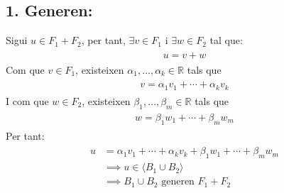 \documentclass[a4paper, 11pt]{article}
\begin{document}
            \subsection*{1. Generen:}
                Sigui ${u \in F_1 + F_2}$, per tant, ${\exists v \in F_1 \text{ i } \exists w\in F_2}$ tal que:
                \begin{align*}
                    \begin{aligned}
                        u = v + w
                    \end{aligned}
                \end{align*}
                Com que ${v \in F_1}$, existeixen ${\alpha_1,\dots,\alpha_k \in \mathbb{R}}$ tals que 
                \begin{align*}
                    \begin{aligned}
                        v = \alpha_1v_1+\cdots+\alpha_kv_k
                    \end{aligned}
                \end{align*}
                I com que ${w \in F_2}$, existeixen ${\beta_1,\dots,\beta_m \in \mathbb{R}}$ tals que 
                \begin{align*}
                    \begin{aligned}
                        w = \beta_1w_1+\cdots+\beta_mw_m
                    \end{aligned}
                \end{align*}
                Per tant:
                \begin{align*}
                    \begin{aligned}
                        u &= \alpha_1v_1+\cdots+\alpha_kv_k + \beta_1w_1+\cdots+\beta_mw_m\\
                        &\implies u \in \langle B_1 \cup B_2 \rangle \\
                        &\implies B_1 \cup B_2 \text{ generen } F_1 + F_2
                    \end{aligned}
                \end{align*}
\end{document}
